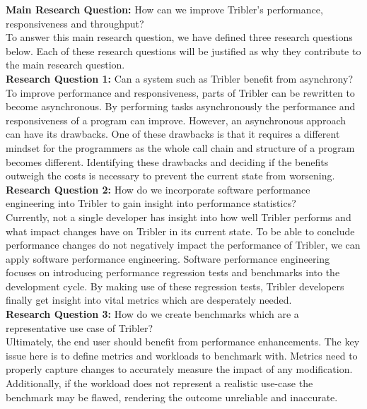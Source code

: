 \textbf{Main Research Question:} How can we improve Tribler's performance, responsiveness and throughput?\\

To answer this main research question, we have defined three research questions below. Each of these research questions will be justified as why they contribute to the main research question.\\

\textbf{Research Question 1:} Can a system such as Tribler benefit from asynchrony?\\

To improve performance and responsiveness, parts of Tribler can be rewritten to become asynchronous.
By performing tasks asynchronously the performance and responsiveness of a program can improve.
However, an asynchronous approach can have its drawbacks. 
One of these drawbacks is that it requires a different mindset for the programmers as the whole call chain and structure of a program becomes different.
Identifying these drawbacks and deciding if the benefits outweigh the costs is necessary to prevent the current state from worsening. \\

\noindent
\textbf{Research Question 2:} How do we incorporate software performance engineering into Tribler to gain insight into performance statistics?\\

Currently, not a single developer has insight into how well Tribler performs and what impact changes have on Tribler in its current state.
To be able to conclude performance changes do not negatively impact the performance of Tribler, we can apply software performance engineering.
Software performance engineering focuses on introducing performance regression tests and benchmarks into the development cycle.
By making use of these regression tests, Tribler developers finally get insight into vital metrics which are desperately needed.\\

\textbf{Research Question 3:} How do we create benchmarks which are a representative use case of Tribler?\\

Ultimately, the end user should benefit from performance enhancements.
The key issue here is to define metrics and workloads to benchmark with.
Metrics need to properly capture changes to accurately measure the impact of any modification.
Additionally, if the workload does not represent a realistic use-case the benchmark may be flawed, rendering the outcome unreliable and inaccurate.


